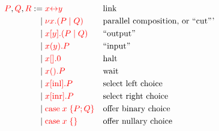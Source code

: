 \begin{definition}[Terms]\label{def:cp-terms}
  \[\!
    \begin{aligned}
      \textcolor{red}{P}, \textcolor{red}{Q}, \textcolor{red}{R}
           :=& \; \textcolor{red}{x{\leftrightarrow}y}       &&\text{link}
      \\ \mid& \; \textcolor{red}{\nu x.(P \mid Q)}     &&\text{parallel composition, or ``cut'''}
      \\ \mid& \; \textcolor{red}{x[y].(P \mid Q)} &&\text{``output''}
      \\ \mid& \; \textcolor{red}{x(y).P}    &&\text{``input''}
      \\ \mid& \; \textcolor{red}{x[].0}          &&\text{halt}
      \\ \mid& \; \textcolor{red}{x().P}       &&\text{wait}
      \\ \mid& \; \textcolor{red}{x[\text{inl}].P}        &&\text{select left choice}
      \\ \mid& \; \textcolor{red}{x[\text{inr}].P}        &&\text{select right choice}
      \\ \mid& \; \textcolor{red}{\text{case}\;x\;\{P;Q\}}    &&\text{offer binary choice}
      \\ \mid& \; \textcolor{red}{\text{case}\;x\;\{\}}        &&\text{offer nullary choice}
    \end{aligned}
  \]  
\end{definition}
